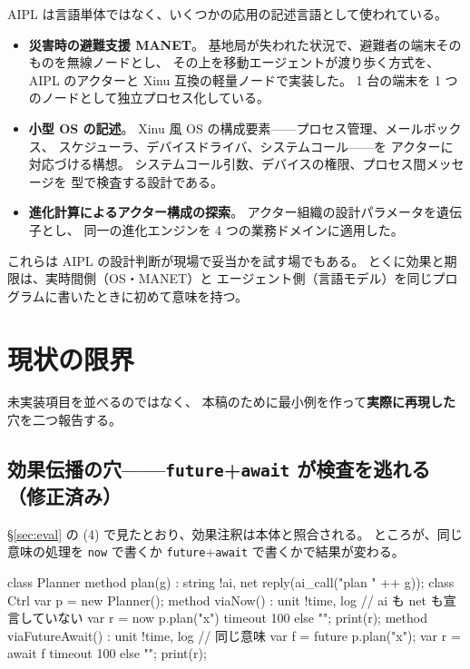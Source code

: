 \documentclass[11pt,a4paper]{ltjsarticle}
\theoremstyle{definition}
\theoremstyle{remark}
\begin{document}
AIPL は言語単体ではなく、いくつかの応用の記述言語として使われている。

\begin{itemize}
\item \textbf{災害時の避難支援 MANET}\cite{selfmanet}。
      基地局が失われた状況で、避難者の端末そのものを無線ノードとし、
      その上を移動エージェントが渡り歩く方式を、
      AIPL のアクターと Xinu 互換の軽量ノードで実装した。
      1 台の端末を 1 つのノードとして独立プロセス化している。
\item \textbf{小型 OS の記述}\cite{selfxinu}。
      Xinu 風 OS の構成要素——プロセス管理、メールボックス、
      スケジューラ、デバイスドライバ、システムコール——を
      アクターに対応づける構想。
      システムコール引数、デバイスの権限、プロセス間メッセージを
      型で検査する設計である。
\item \textbf{進化計算によるアクター構成の探索}\cite{selfevo}。
      アクター組織の設計パラメータを遺伝子とし、
      同一の進化エンジンを 4 つの業務ドメインに適用した。
\end{itemize}

これらは AIPL の設計判断が現場で妥当かを試す場でもある。
とくに効果と期限は、実時間側（OS・MANET）と
エージェント側（言語モデル）を同じプログラムに書いたときに初めて意味を持つ。

\section{現状の限界}
\label{sec:limits}

未実装項目を並べるのではなく、
本稿のために最小例を作って\textbf{実際に再現した}穴を二つ報告する。

\subsection{効果伝播の穴——\texttt{future}+\texttt{await} が検査を逃れる（修正済み）}

\S\ref{sec:eval} の (4) で見たとおり、効果注釈は本体と照合される。
ところが、同じ意味の処理を \texttt{now} で書くか
\texttt{future}+\texttt{await} で書くかで結果が変わる。

\begin{aipl}
class Planner {
  method plan(g) : string !{ai, net} { reply(ai_call("plan " ++ g)); }
}
class Ctrl {
  var p = new Planner();
  method viaNow() : unit !{time, log} {          // ai も net も宣言していない
    var r = now p.plan("x") timeout 100 else "";
    print(r);
  }
  method viaFutureAwait() : unit !{time, log} {  // 同じ意味
    var f = future p.plan("x");
    var r = await f timeout 100 else "";
    print(r);
  }
}
\end{aipl}
\end{document}

